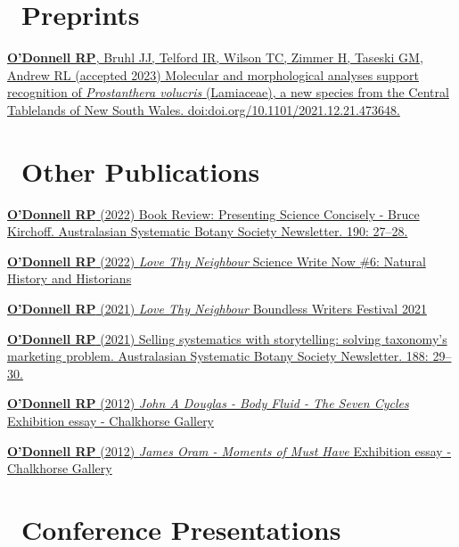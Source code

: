 \documentclass[10,a4paper,]{awesome-cv}
\begin{document}
\hypertarget{preprints}{%
\section{\texorpdfstring{\acvHeaderIconSep~Preprints}{~Preprints}}\label{preprints}}

\href{https://doi.org/10.1101/2021.12.21.473648}{\textbf{O'Donnell RP},
Bruhl JJ, Telford IR, Wilson TC, Zimmer H, Taseski GM, Andrew RL
(accepted 2023) Molecular and morphological analyses support recognition
of \emph{Prostanthera volucris} (Lamiaceae), a new species from the
Central Tablelands of New South Wales.
doi:doi.org/10.1101/2021.12.21.473648.}

\hypertarget{other-publications}{%
\section{\texorpdfstring{\acvHeaderIconSep~Other
Publications}{~Other Publications}}\label{other-publications}}

\href{https://asbs.org.au/newsletter/pdf/22-mar-190.pdf}{\textbf{O'Donnell
RP} (2022) Book Review: Presenting Science Concisely - Bruce Kirchoff.
Australasian Systematic Botany Society Newsletter. 190: 27--28.}

\href{https://www.sciencewritenow.com/essays-craft-memoir/love-thy-neighbour}{\textbf{O'Donnell
RP} (2022) \emph{Love Thy Neighbour} Science Write Now \#6: Natural
History and Historians}

\href{https://www.sciencewritenow.com/essays-craft-memoir/love-thy-neighbour}{\textbf{O'Donnell
RP} (2021) \emph{Love Thy Neighbour} Boundless Writers Festival 2021}

\href{https://www.asbs.org.au/newsletter/pdf/21-sep-188.pdf}{\textbf{O'Donnell
RP} (2021) Selling systematics with storytelling: solving taxonomy's
marketing problem. Australasian Systematic Botany Society Newsletter.
188: 29--30.}

\href{https://rpodonnell.github.io/cv/JAD_BODY_FLUIDfinal.pdf}{\textbf{O'Donnell
RP} (2012) \emph{John A Douglas - Body Fluid - The Seven Cycles}
Exhibition essay - Chalkhorse Gallery}

\href{https://rpodonnell.github.io/cv/JamesOramMomentsofmusthave_RS.pdf}{\textbf{O'Donnell
RP} (2012) \emph{James Oram - Moments of Must Have} Exhibition essay -
Chalkhorse Gallery}

\hypertarget{conference-presentations}{%
\section{\texorpdfstring{\acvHeaderIconSep~Conference
Presentations}{~Conference Presentations}}\label{conference-presentations}}
\end{document}
